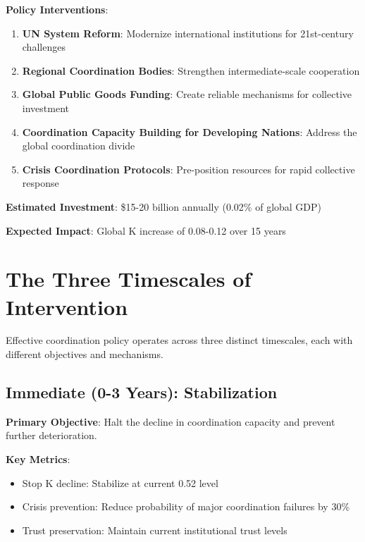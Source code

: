 \documentclass[12pt,letterpaper]{article}
\begin{document}
\textbf{Policy Interventions}:

\begin{enumerate}
    \item \textbf{UN System Reform}: Modernize international institutions for 21st-century challenges
    \item \textbf{Regional Coordination Bodies}: Strengthen intermediate-scale cooperation
    \item \textbf{Global Public Goods Funding}: Create reliable mechanisms for collective investment
    \item \textbf{Coordination Capacity Building for Developing Nations}: Address the global coordination divide
    \item \textbf{Crisis Coordination Protocols}: Pre-position resources for rapid collective response
\end{enumerate}

\textbf{Estimated Investment}: \$15-20 billion annually (0.02\% of global GDP)

\textbf{Expected Impact}: Global K increase of 0.08-0.12 over 15 years

\section{The Three Timescales of Intervention}

Effective coordination policy operates across three distinct timescales, each with different objectives and mechanisms.

\subsection{Immediate (0-3 Years): Stabilization}

\textbf{Primary Objective}: Halt the decline in coordination capacity and prevent further deterioration.

\textbf{Key Metrics}:
\begin{itemize}
    \item Stop K decline: Stabilize at current 0.52 level
    \item Crisis prevention: Reduce probability of major coordination failures by 30\%
    \item Trust preservation: Maintain current institutional trust levels
\end{itemize}
\end{document}
